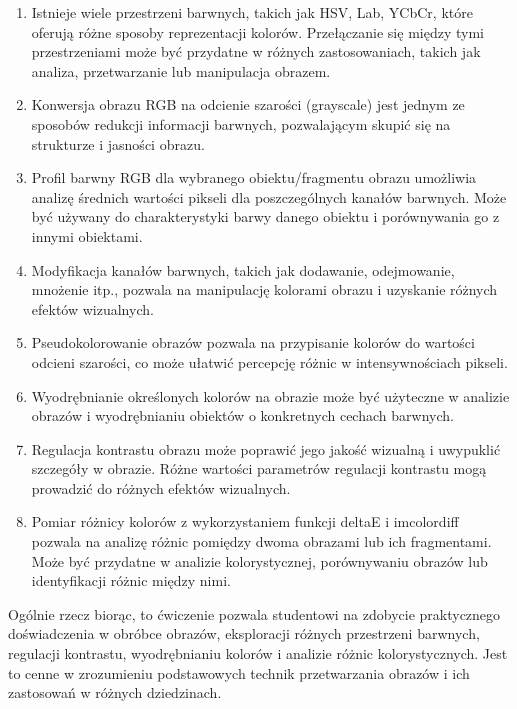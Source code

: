 \documentclass[10pt,a4paper,twoside,twocolumn]{article}%
\begin{document}
\begin{enumerate}
    \item Istnieje wiele przestrzeni barwnych, takich jak HSV, Lab, YCbCr, które oferują różne sposoby reprezentacji kolorów. Przełączanie się między tymi przestrzeniami może być przydatne w różnych zastosowaniach, takich jak analiza, przetwarzanie lub manipulacja obrazem.
    
    \item Konwersja obrazu RGB na odcienie szarości (grayscale) jest jednym ze sposobów redukcji informacji barwnych, pozwalającym skupić się na strukturze i jasności obrazu.
    
    \item Profil barwny RGB dla wybranego obiektu/fragmentu obrazu umożliwia analizę średnich wartości pikseli dla poszczególnych kanałów barwnych. Może być używany do charakterystyki barwy danego obiektu i porównywania go z innymi obiektami.
    
    \item Modyfikacja kanałów barwnych, takich jak dodawanie, odejmowanie, mnożenie itp., pozwala na manipulację kolorami obrazu i uzyskanie różnych efektów wizualnych.
    
    \item Pseudokolorowanie obrazów pozwala na przypisanie kolorów do wartości odcieni szarości, co może ułatwić percepcję różnic w intensywnościach pikseli.
    
    \item Wyodrębnianie określonych kolorów na obrazie może być użyteczne w analizie obrazów i wyodrębnianiu obiektów o konkretnych cechach barwnych.
    
    \item Regulacja kontrastu obrazu może poprawić jego jakość wizualną i uwypuklić szczegóły w obrazie. Różne wartości parametrów regulacji kontrastu mogą prowadzić do różnych efektów wizualnych.
    
    \item Pomiar różnicy kolorów z wykorzystaniem funkcji deltaE i imcolordiff pozwala na analizę różnic pomiędzy dwoma obrazami lub ich fragmentami. Może być przydatne w analizie kolorystycznej, porównywaniu obrazów lub identyfikacji różnic między nimi.
\end{enumerate}

Ogólnie rzecz biorąc, to ćwiczenie pozwala studentowi na zdobycie praktycznego doświadczenia w obróbce obrazów, eksploracji różnych przestrzeni barwnych, regulacji kontrastu, wyodrębnianiu kolorów i analizie różnic kolorystycznych. Jest to cenne w zrozumieniu podstawowych technik przetwarzania obrazów i ich zastosowań w różnych dziedzinach.
\end{document}
